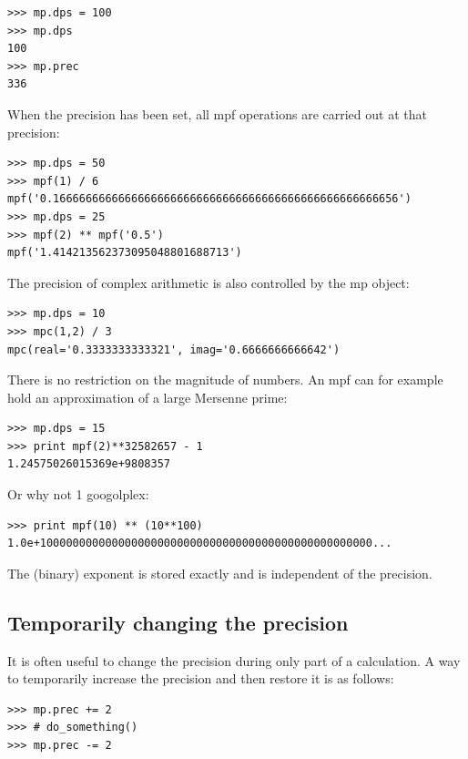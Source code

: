 \begin{lstlisting}
>>> mp.dps = 100
>>> mp.dps
100
>>> mp.prec
336
\end{lstlisting}


When the precision has been set, all mpf operations are carried out at that precision:

\begin{lstlisting}
>>> mp.dps = 50
>>> mpf(1) / 6
mpf('0.16666666666666666666666666666666666666666666666666656')
>>> mp.dps = 25
>>> mpf(2) ** mpf('0.5')
mpf('1.414213562373095048801688713')
\end{lstlisting}

The precision of complex arithmetic is also controlled by the mp object:

\begin{lstlisting}
>>> mp.dps = 10
>>> mpc(1,2) / 3
mpc(real='0.3333333333321', imag='0.6666666666642')
\end{lstlisting}


There is no restriction on the magnitude of numbers. An mpf can for example hold an approximation of a large Mersenne prime:

\begin{lstlisting}
>>> mp.dps = 15
>>> print mpf(2)**32582657 - 1
1.24575026015369e+9808357
\end{lstlisting}


Or why not 1 googolplex:

\begin{lstlisting}
>>> print mpf(10) ** (10**100)
1.0e+100000000000000000000000000000000000000000000000000...
\end{lstlisting}


The (binary) exponent is stored exactly and is independent of the precision.


\subsection{Temporarily changing the precision}  

It is often useful to change the precision during only part of a calculation. A way to temporarily increase the precision and then restore it is as follows:

\begin{lstlisting}
>>> mp.prec += 2
>>> # do_something()
>>> mp.prec -= 2
\end{lstlisting}



